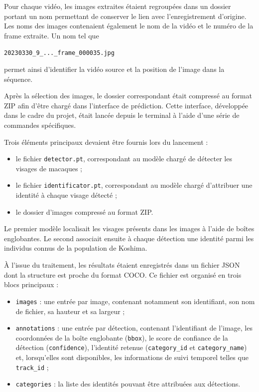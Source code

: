 \documentclass[11pt,a4paper]{report}
\begin{document}
Pour chaque vidéo, les images extraites étaient regroupées dans un dossier
portant un nom permettant de conserver le lien avec l'enregistrement d'origine.
Les noms des images contenaient également le nom de la vidéo et le numéro de la
frame extraite. Un nom tel que

\begin{center}
    \texttt{20230330\_9\_...\_frame\_000035.jpg}
\end{center}

permet ainsi d'identifier la vidéo source et la position de l'image dans la
séquence.

Après la sélection des images, le dossier correspondant était compressé au
format ZIP afin d'être chargé dans l'interface de prédiction. Cette interface,
développée dans le cadre du projet, était lancée depuis le terminal à l'aide
d'une série de commandes spécifiques.

Trois éléments principaux devaient être fournis lors du lancement :

\begin{itemize}
    \item le fichier \texttt{detector.pt}, correspondant au modèle chargé de
    détecter les visages de macaques ;
    \item le fichier \texttt{identificator.pt}, correspondant au modèle chargé
    d'attribuer une identité à chaque visage détecté ;
    \item le dossier d'images compressé au format ZIP.
\end{itemize}

Le premier modèle localisait les visages présents dans les images à l'aide de
boîtes englobantes. Le second associait ensuite à chaque détection une identité
parmi les individus connus de la population de Koshima.

À l'issue du traitement, les résultats étaient enregistrés dans un fichier JSON
dont la structure est proche du format COCO. Ce fichier est organisé en trois
blocs principaux :

\begin{itemize}
    \item \texttt{images} : une entrée par image, contenant notamment son
    identifiant, son nom de fichier, sa hauteur et sa largeur ;

    \item \texttt{annotations} : une entrée par détection, contenant
    l'identifiant de l'image, les coordonnées de la boîte englobante
    (\texttt{bbox}), le score de confiance de la détection
    (\texttt{confidence}), l'identité retenue
    (\texttt{category\_id} et \texttt{category\_name}) et, lorsqu'elles sont
    disponibles, les informations de suivi temporel telles que
    \texttt{track\_id} ;

    \item \texttt{categories} : la liste des identités pouvant être attribuées
    aux détections.
\end{itemize}
\end{document}
